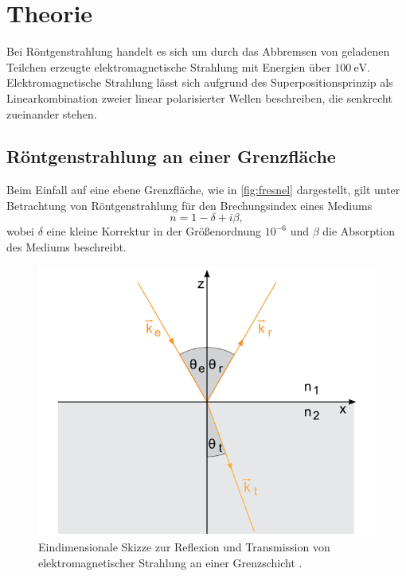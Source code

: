 \section{Theorie}
Bei Röntgenstrahlung handelt es sich um durch das Abbremsen von geladenen Teilchen erzeugte elektromagnetische Strahlung mit Energien über $\SI{100}{\electronvolt}$. Elektromagnetische Strahlung lässt sich aufgrund des Superpositionsprinzip als Linearkombination zweier linear polarisierter Wellen beschreiben, die senkrecht zueinander stehen.

\subsection{Röntgenstrahlung an einer Grenzfläche}
Beim Einfall auf eine ebene Grenzfläche, wie in \autoref{fig:fresnel} dargestellt, gilt unter Betrachtung von Röntgenstrahlung für den Brechungsindex eines Mediums
\begin{equation*}
  n = 1 - \delta + i \beta,
\end{equation*}
wobei $\delta$ eine kleine Korrektur in der Größenordnung $10^{-6}$ und $\beta$ die Absorption des Mediums beschreibt.

\begin{figure}[H]
  \centering
  \includegraphics{fresnel.png}
  \caption{Eindimensionale Skizze zur Reflexion und Transmission von elektromagnetischer Strahlung an einer Grenzschicht \cite{fresnel}.}
  \label{fig:fresnel}
\end{figure}

